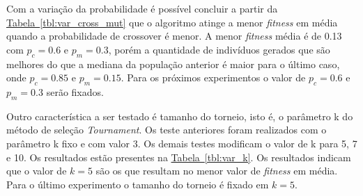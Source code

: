 \documentclass[a4paper]{paper}
\begin{document}
Com a variação da probabilidade é possível concluir a partir da
\hyperref[tbl:var_cross_mut]{Tabela~\ref*{tbl:var_cross_mut}} que o algoritmo
atinge a menor \textit{fitness} em média quando a probabilidade de crossover é
menor.  A menor \textit{fitness} média é de 0.13 com $p_c = 0.6$ e $ p_m = 0.3
$, porém a quantidade de indivíduos gerados que são melhores do que a mediana da
população anterior é maior para o último caso, onde $p_c = 0.85$ e $ p_m =
0.15$. Para os próximos experimentos o valor de $p_c = 0.6$ e $ p_m = 0.3$ serão
fixados.

Outro característica a ser testado é tamanho do torneio, isto é, o parâmetro k
do método de seleção \textit{Tournament}. Os teste anteriores foram realizados
com o parâmetro k fixo e com valor 3. Os demais testes modificam o valor de k
para 5, 7 e 10. Os resultados estão presentes na
\hyperref[tbl:var_k]{Tabela~\ref*{tbl:var_k}}. Os resultados indicam que o valor
de $k=5$ são os que resultam no menor valor de \textit{fitness} em média. Para o
último experimento o tamanho do torneio é fixado em $k=5$.
\end{document}
